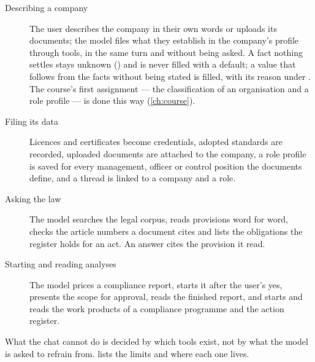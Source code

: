 \begin{description}
  \item[Describing a company] The user describes the company in their own words or uploads
    its documents; the model files what they establish in the company's profile through tools,
    in the same turn and without being asked. A fact nothing settles stays unknown
    () and is never filled with a default; a value that follows from the facts
    without being stated is filled, with its reason under . The course's first assignment --- the
    classification of an organisation and a role profile --- is done this way
    (\cref{ch:course}).
  \item[Filing its data] Licences and certificates become credentials, adopted standards are
    recorded, uploaded documents are attached to the company, a role profile is saved for every
    management, officer or control position the documents define, and a thread is linked to a
    company and a role.
  \item[Asking the law] The model searches the legal corpus, reads provisions word for word,
    checks the article numbers a document cites and lists the obligations the register holds
    for an act. An answer cites the provision it read.
  \item[Starting and reading analyses] The model prices a compliance report, starts it after
    the user's yes, presents the scope for approval, reads the finished report, and starts and
    reads the work products of a compliance programme and the action register.
\end{description}

What the chat cannot do is decided by which tools exist, not by what the model is asked to
refrain from.  lists the limits and where each one lives.

